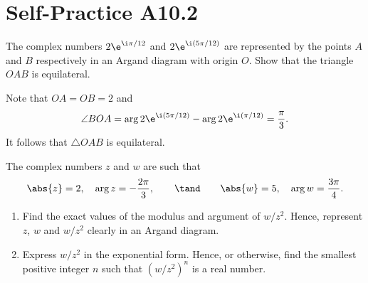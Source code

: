 \section{Self-Practice A10.2}

\begin{problem}
    The complex numbers $2\e^{\i \pi /12}$ and $2\e^{\i (5\pi/12)}$ are represented by the points $A$ and $B$ respectively in an Argand diagram with origin $O$. Show that the triangle $OAB$ is equilateral.
\end{problem}
\begin{solution}
    Note that $OA = OB = 2$ and \[\angle BOA = \arg{2\e^{\i (5\pi/12)}} - \arg{2\e^{\i (\pi/12)}} = \frac\pi3.\] It follows that $\triangle OAB$ is equilateral.
\end{solution}

\begin{problem}
    The complex numbers $z$ and $w$ are such that \[\abs{z} = 2, \quad \arg{z} = -\frac{2\pi}3, \qquad \tand \qquad \abs{w} = 5, \quad \arg{w} = \frac{3\pi}4.\]

    \begin{enumerate}
        \item Find the exact values of the modulus and argument of $w/z^2$. Hence, represent $z$, $w$ and $w/z^2$ clearly in an Argand diagram.
        \item Express $w/z^2$ in the exponential form. Hence, or otherwise, find the smallest positive integer $n$ such that $(w/z^2)^n$ is a real number.
    \end{enumerate}
\end{problem}
